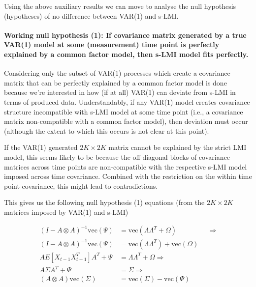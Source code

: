 \documentclass[
  letterpaper,
  DIV=11,
  numbers=noendperiod]{scrartcl}
\let\oldparagraph\paragraph
\renewcommand{\paragraph}[1]{\oldparagraph{#1}\mbox{}}
\begin{document}
Using the above auxiliary results we can move to analyse the null
hypothesis (hypotheses) of no difference between VAR(1) and s-LMI.

\hypertarget{working-null-hypothesis-1-if-covariance-matrix-generated-by-a-true-var1-model-at-some-measurement-time-point-is-perfectly-explained-by-a-common-factor-model-then-s-lmi-model-fits-perfectly.}{%
\paragraph{Working null hypothesis (1): If covariance matrix generated
by a true VAR(1) model at some (measurement) time point is perfectly
explained by a common factor model, then s-LMI model fits
perfectly.}\label{working-null-hypothesis-1-if-covariance-matrix-generated-by-a-true-var1-model-at-some-measurement-time-point-is-perfectly-explained-by-a-common-factor-model-then-s-lmi-model-fits-perfectly.}}

Considering only the subset of VAR(1) processes which create a
covariance matrix that can be perfectly explained by a common factor
model is done because we're interested in how (if at all) VAR(1) can
deviate from s-LMI in terms of produced data. Understandably, if any
VAR(1) model creates covariance structure incompatible with s-LMI model
at some time point (i.e., a covariance matrix non-compatible with a
common factor model), then deviation must occur (although the extent to
which this occurs is not clear at this point).

If the VAR(1) generated \(2K\times2K\) matrix cannot be explained by the
strict LMI model, this seems likely to be because the off diagonal
blocks of covariance matrices across time points are non-compatible with
the respective s-LMI model imposed across time covariance. Combined with
the restriction on the within time point covariance, this might lead to
contradictions.

This gives us the following null hypothesis (1) equations (from the
\(2K\times2K\) matrices imposed by VAR(1) and s-LMI)

\[
\begin{align*}
(I-A \otimes A)^{-1} \text{vec}(\Psi) &= \text{vec}(\Lambda \Lambda^T + \Omega)&&\Rightarrow
\\
(I-A \otimes A)^{-1} \text{vec}(\Psi) &= \text{vec}(\Lambda \Lambda^T) + \text{vec}(\Omega)
\\
AE[X_{t-1}X_{t-1}^T]A^T + \Psi&=\Lambda \Lambda^T + \Omega\Rightarrow
\\
A\Sigma A^T+\Psi&=\Sigma\Rightarrow\\
(A\otimes A)\text{vec}(\Sigma)&=\text{vec}(\Sigma)-\text{vec}(\Psi)
\end{align*}
\]
\end{document}
